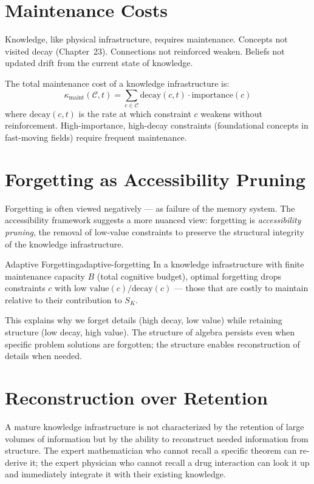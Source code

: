 \section{Maintenance Costs}

Knowledge, like physical infrastructure, requires maintenance. Concepts
not visited decay (Chapter~23). Connections not reinforced weaken.
Beliefs not updated drift from the current state of knowledge.

The total maintenance cost of a knowledge infrastructure is:
\[
  \kappa_\text{maint}(\mathcal{C}, t) = \sum_{c \in \mathcal{C}}
  \text{decay}(c, t) \cdot \text{importance}(c)
\]
where $\text{decay}(c, t)$ is the rate at which constraint $c$
weakens without reinforcement. High-importance, high-decay constraints
(foundational concepts in fast-moving fields) require frequent maintenance.

\section{Forgetting as Accessibility Pruning}

Forgetting is often viewed negatively — as failure of the memory system.
The accessibility framework suggests a more nuanced view: forgetting is
\emph{accessibility pruning}, the removal of low-value constraints to
preserve the structural integrity of the knowledge infrastructure.

\begin{proposition}{Adaptive Forgetting}{adaptive-forgetting}
  In a knowledge infrastructure with finite maintenance capacity
  $B$ (total cognitive budget), optimal forgetting drops constraints
  $c$ with low $\text{value}(c) / \text{decay}(c)$ — those that
  are costly to maintain relative to their contribution to $S_K$.
\end{proposition}

This explains why we forget details (high decay, low value) while
retaining structure (low decay, high value). The structure of algebra
persists even when specific problem solutions are forgotten; the
structure enables reconstruction of details when needed.

\section{Reconstruction over Retention}

A mature knowledge infrastructure is not characterized by the retention
of large volumes of information but by the ability to reconstruct
needed information from structure. The expert mathematician who cannot
recall a specific theorem can re-derive it; the expert physician who
cannot recall a drug interaction can look it up and immediately integrate
it with their existing knowledge.

